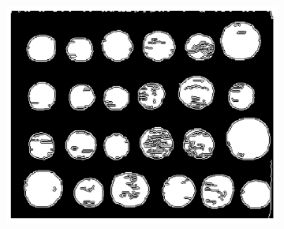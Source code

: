 \documentclass[11pt]{article}
\begin{document}
\begin{figure}[H]
\begin{subfigure}{.33\textwidth}
        \includegraphics[width=\linewidth]{figs/q1c_mask_edges.png}
        \caption{}
    \end{subfigure}%


\end{figure}
\end{document}
